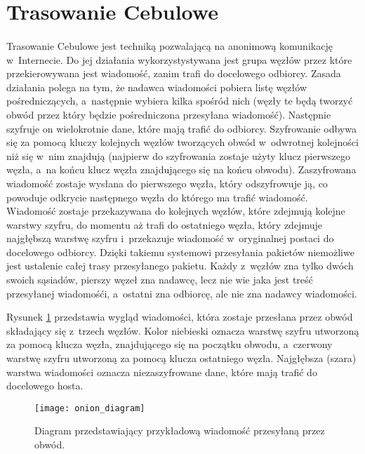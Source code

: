 \section{Trasowanie Cebulowe}\paragraph{}
Trasowanie Cebulowe jest techniką pozwalającą na anonimową komunikację w~Internecie. Do jej działania wykorzystystywana jest grupa węzłów przez które przekierowywana jest wiadomość, zanim trafi do docelowego odbiorcy. Zasada działania polega na tym, że nadawca wiadomości pobiera listę węzłów pośredniczących, a~następnie wybiera kilka spośród nich (węzły te będą tworzyć obwód przez który będzie pośredniczona przesyłana wiadomość). Następnie szyfruje on wielokrotnie dane, które mają trafić do odbiorcy. Szyfrowanie odbywa się za pomocą kluczy kolejnych węzłów tworzących obwód w~odwrotnej kolejności niż się w~nim znajdują (najpierw do szyfrowania zostaje użyty klucz pierwszego węzła, a~na końcu klucz węzła znajdującego się na końcu obwodu). Zaszyfrowana wiadomość zostaje wysłana do pierwszego węzła, który odszyfrowuje ją, co powoduje odkrycie następnego węzła do którego ma trafić wiadomość. Wiadomość zostaje przekazywana do kolejnych węzłów, które zdejmują kolejne warstwy szyfru, do momentu aż trafi do ostatniego węzła, który zdejmuje najgłębszą warstwę szyfru i~przekazuje wiadomość w~oryginalnej postaci do docelowego odbiorcy. Dzięki takiemu systemowi przesyłania pakietów niemożliwe jest ustalenie całej trasy przesyłanego pakietu. Każdy z~węzłów zna tylko dwóch swoich sąsiadów, pierszy węzeł zna nadawcę, lecz nie wie jaka jest treść przesyłanej wiadomośći, a~ostatni zna odbiorcę, ale nie zna nadawcy wiadomości.

Rysunek \ref{rys:onion_diagram} przedstawia wygląd wiadomości, która zostaje przesłana przez obwód składający się z~trzech węzłów. Kolor niebieski oznacza warstwę szyfru utworzoną za pomocą klucza węzła, znajdującego się na początku obwodu, a~czerwony warstwę szyfru utworzoną za pomocą klucza ostatniego węzła. Najgłębsza (szara) warstwa wiadomości oznacza niezaszyfrowane dane, które mają trafić do docelowego hosta.
\begin{figure}
 \centering
 \texttt{[image: onion\_diagram]}
 \caption[Caption for LOR]{Diagram przedstawiający przykładową wiadomość przesyłaną przez obwód.\footnotemark}
 \label{rys:onion_diagram}
\end{figure}

